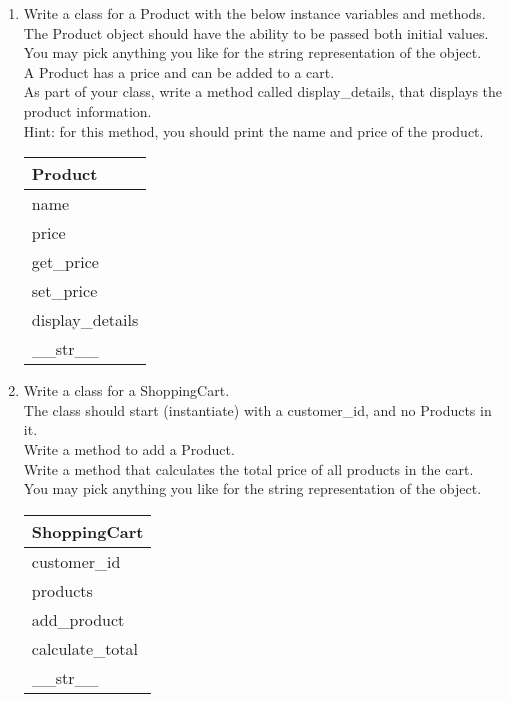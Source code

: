 	\item
	\begin{enumerate}
		\item
			Write a class for a Product with the below instance variables and methods.\\ 
			The Product object should have the ability to be passed both initial values.\\  
			You may pick anything you like for the string representation of the object.\\
			A Product has a price and can be added to a cart.\\  
			As part of your class, write a method called display\_details, that displays the product information.\\
			Hint: for this method, you should print the name and price of the product.
			\begin{flushright}
			\begin{tabular}{|l|}
				\hline
				Product\\ \hline
				name\\	price\\	 \hline
				get\_price \\ set\_price \\ display\_details \\ \_\_str\_\_ \\ \hline
			\end{tabular}
			\end{flushright}

		\item
			Write a class for a ShoppingCart. \\
			The class should start (instantiate) with a customer\_id, and no Products in it. \\ 
			Write a method to add a Product.\\
			Write a method that calculates the total price of all products in the cart.\\
			You may pick anything you like for the string representation of the object.
	
			\begin{flushright}
			\begin{tabular}{|l|}
				\hline
				ShoppingCart\\ \hline  	%
				customer\_id \\ products\\ \hline		%
				add\_product \\ calculate\_total \\ \_\_str\_\_ \\ \hline		%
			\end{tabular}
			\end{flushright}


\end{enumerate}
